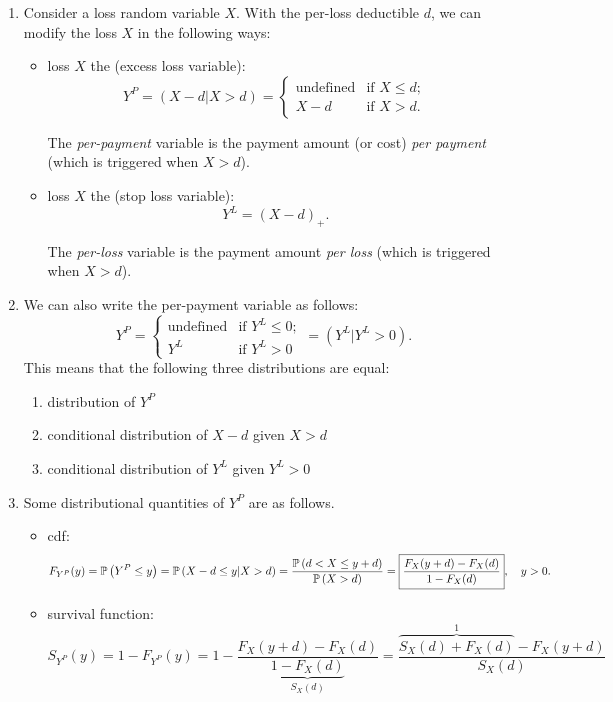 \begin{enumerate}
\item Consider a loss random variable \(X\). With the per-loss deductible
\(d\), we can modify the loss \(X\) in the following ways:
\begin{itemize}
\item loss \(X\)  the  (excess
loss variable):
\[
Y^P=(X-d|X>d)=\begin{cases}
\text{undefined}&\text{if \(X\le d\)};\\
X-d&\text{if \(X>d\)}.
\end{cases}
\]
\begin{note}
The \emph{per-payment} variable is the payment amount (or cost) \emph{per
payment} (which is triggered when \(X>d\)).
\end{note}
\item loss \(X\)  the  (stop loss
variable):
\[
Y^L=(X-d)_{+}.
\]
\begin{note}
The \emph{per-loss} variable is the payment amount \emph{per loss} (which
is triggered when \(X>d\)).
\end{note}
\end{itemize}
\item \label{it:yp-expr-yl}
We can also write the per-payment variable as follows:
\[
Y^P=\begin{cases}
\text{undefined}&\text{if \(Y^L\le 0\)};\\
Y^L&\text{if \(Y^L>0\)}
\end{cases}
=\boxed{(Y^L|Y^L>0)}.
\]
This means that the following three distributions are equal:
\begin{enumerate}
\item distribution of \(Y^P\)
\item conditional distribution of \(X-d\) given \(X>d\)
\item conditional distribution of \(Y^L\) given \(Y^L>0\)
\end{enumerate}
\item \label{it:yp-dist-quantities}
Some distributional quantities of \(Y^P\) are as follows.
\begin{itemize}
\item cdf: \[
F_{Y^P}(y)=\mathbb{P}\left(Y^P\le y\right)=\mathbb{P}\left(X-d\le y|X>d\right)=\frac{\mathbb{P}\left(d<X\le y+d\right)}{\mathbb{P}\left(X>d\right)}
=\boxed{\frac{F_X(y+d)-F_X(d)}{1-F_X(d)}},\quad y>0.
\]
\item survival function: 
\[
S_{Y^P}(y)=1-F_{Y^P}(y)=1-\frac{F_X(y+d)-F_X(d)}{\underbrace{1-F_X(d)}_{S_X(d)}}
=\frac{\overbrace{S_X(d)+F_X(d)}^{1}-F_X(y+d)}{S_X(d)}
\]
\end{itemize}
\end{enumerate}

